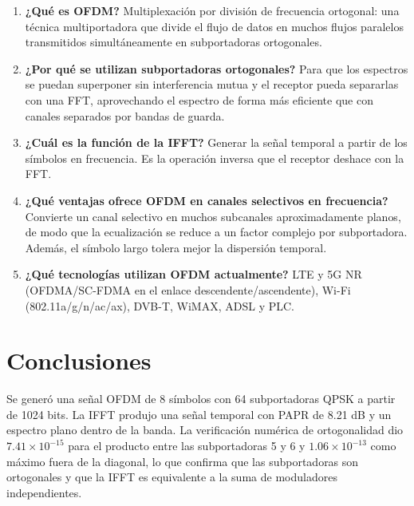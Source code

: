 \documentclass[11pt,a4paper]{article}
\begin{document}
\begin{enumerate}
  \item \textbf{¿Qué es OFDM?} Multiplexación por división de frecuencia ortogonal: una
        técnica multiportadora que divide el flujo de datos en muchos flujos paralelos
        transmitidos simultáneamente en subportadoras ortogonales.
  \item \textbf{¿Por qué se utilizan subportadoras ortogonales?} Para que los espectros se
        puedan superponer sin interferencia mutua y el receptor pueda separarlas con una
        FFT, aprovechando el espectro de forma más eficiente que con canales separados por
        bandas de guarda.
  \item \textbf{¿Cuál es la función de la IFFT?} Generar la señal temporal a partir de los
        símbolos en frecuencia. Es la operación inversa que el receptor deshace con la FFT.
  \item \textbf{¿Qué ventajas ofrece OFDM en canales selectivos en frecuencia?} Convierte
        un canal selectivo en muchos subcanales aproximadamente planos, de modo que la
        ecualización se reduce a un factor complejo por subportadora. Además, el símbolo
        largo tolera mejor la dispersión temporal.
  \item \textbf{¿Qué tecnologías utilizan OFDM actualmente?} LTE y 5G NR (OFDMA/SC-FDMA en
        el enlace descendente/ascendente), Wi-Fi (802.11a/g/n/ac/ax), DVB-T, WiMAX, ADSL y
        PLC.
\end{enumerate}

\section{Conclusiones}

Se generó una señal OFDM de 8 símbolos con 64 subportadoras QPSK a partir de 1024 bits.
La IFFT produjo una señal temporal con PAPR de 8.21 dB y un espectro plano dentro de la
banda. La verificación numérica de ortogonalidad dio $7.41\times10^{-15}$ para el producto
entre las subportadoras 5 y 6 y $1.06\times10^{-13}$ como máximo fuera de la diagonal, lo
que confirma que las subportadoras son ortogonales y que la IFFT es equivalente a la suma
de moduladores independientes.
\end{document}
